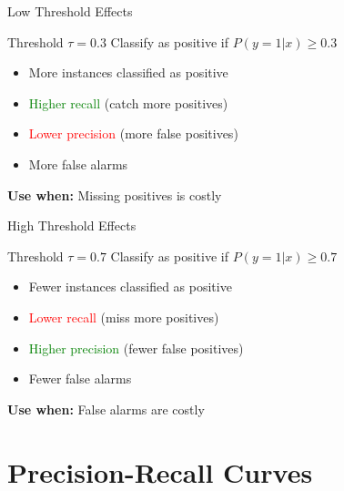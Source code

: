 \documentclass{beamer}
\begin{document}
\begin{frame}{Low Threshold Effects}
\begin{block}{Threshold $\tau = 0.3$}
Classify as positive if $P(y=1|x) \geq 0.3$
\end{block}

\vspace{0.15cm}

\begin{itemize}
    \item More instances classified as positive
    \item \textcolor{green}{Higher recall} (catch more positives)
    \item \textcolor{red}{Lower precision} (more false positives)
    \item More false alarms
\end{itemize}

\vspace{0.15cm}

\begin{center}
\textbf{Use when:} Missing positives is costly
\end{center}
\end{frame}

\begin{frame}{High Threshold Effects}
\begin{block}{Threshold $\tau = 0.7$}
Classify as positive if $P(y=1|x) \geq 0.7$
\end{block}

\vspace{0.15cm}

\begin{itemize}
    \item Fewer instances classified as positive
    \item \textcolor{red}{Lower recall} (miss more positives)
    \item \textcolor{green}{Higher precision} (fewer false positives)
    \item Fewer false alarms
\end{itemize}

\vspace{0.15cm}

\begin{center}
\textbf{Use when:} False alarms are costly
\end{center}
\end{frame}

\section{Precision-Recall Curves}
\end{document}
